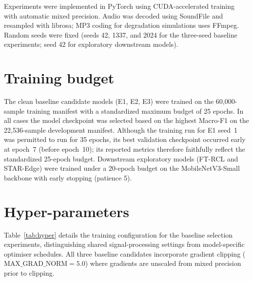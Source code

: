 Experiments were implemented in PyTorch using CUDA-accelerated training with automatic mixed precision. Audio was decoded using SoundFile and resampled with librosa; MP3 coding for degradation simulations uses FFmpeg. Random seeds were fixed (seeds 42, 1337, and 2024 for the three-seed baseline experiments; seed 42 for exploratory downstream models).

\section{Training budget}
\label{sec:budget}

The clean baseline candidate models (E1, E2, E3) were trained on the 60{,}000-sample training manifest with a standardized maximum budget of 25 epochs. In all cases the model checkpoint was selected based on the highest Macro-F1 on the 22{,}536-sample development manifest. Although the training run for E1 seed~1 was permitted to run for 35 epochs, its best validation checkpoint occurred early at epoch~7 (before epoch~10); its reported metrics therefore faithfully reflect the standardized 25-epoch budget. Downstream exploratory models (FT-RCL and STAR-Edge) were trained under a 20-epoch budget on the MobileNetV3-Small backbone with early stopping (patience 5).

\section{Hyper-parameters}
\label{sec:hyper}

Table~\ref{tab:hyper} details the training configuration for the baseline selection experiments, distinguishing shared signal-processing settings from model-specific optimiser schedules. All three baseline candidates incorporate gradient clipping ($\text{MAX\_GRAD\_NORM}=5.0$) where gradients are unscaled from mixed precision prior to clipping.

